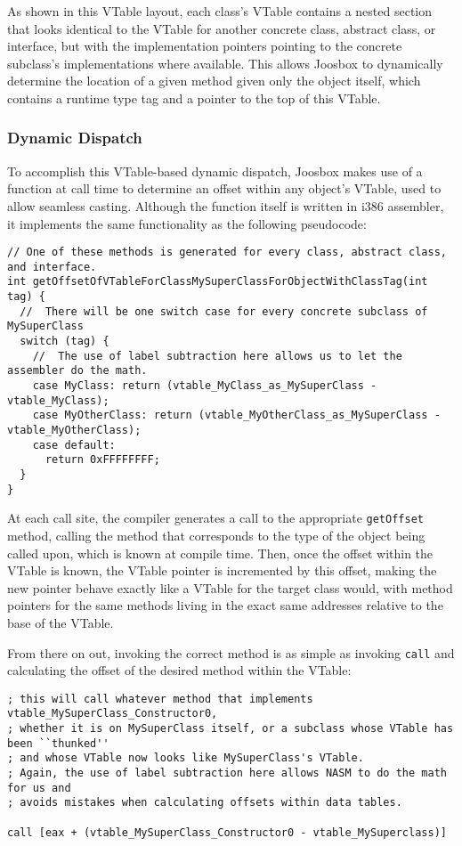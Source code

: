 \documentclass[letterpaper]{article}
\begin{document}
  As shown in this VTable layout, each class's VTable contains a nested section that looks identical
  to the VTable for another concrete class, abstract class, or interface, but with the implementation
  pointers pointing to the concrete subclass's implementations where available. This allows Joosbox to
  dynamically determine the location of a given method given only the object itself, which contains
  a runtime type tag and a pointer to the top of this VTable.

  \subsubsection{Dynamic Dispatch}

  To accomplish this VTable-based dynamic dispatch, Joosbox makes use of a function at call
  time to determine an offset within any object's VTable, used to allow seamless casting. Although
  the function itself is written in i386 assembler, it implements the same functionality as the following
  pseudocode:

  \begin{verbatim}
// One of these methods is generated for every class, abstract class, and interface.
int getOffsetOfVTableForClassMySuperClassForObjectWithClassTag(int tag) {
  //  There will be one switch case for every concrete subclass of MySuperClass
  switch (tag) {
    //  The use of label subtraction here allows us to let the assembler do the math.
    case MyClass: return (vtable_MyClass_as_MySuperClass - vtable_MyClass);
    case MyOtherClass: return (vtable_MyOtherClass_as_MySuperClass - vtable_MyOtherClass);
    case default:
      return 0xFFFFFFFF;
  }
}
  \end{verbatim}

  At each call site, the compiler generates a call to the appropriate {\tt getOffset} method,
  calling the method that corresponds to the type of the object being called upon, which is known at compile
  time. Then, once the offset within the VTable is known, the VTable pointer is incremented by this offset,
  making the new pointer behave exactly like a VTable for the target class would, with method pointers for
  the same methods living in the exact same addresses relative to the base of the VTable.

  From there on out, invoking the correct method is as simple as invoking {\tt call} and
  calculating the offset of the desired method within the VTable:

  \begin{verbatim}
; this will call whatever method that implements vtable_MySuperClass_Constructor0,
; whether it is on MySuperClass itself, or a subclass whose VTable has been ``thunked''
; and whose VTable now looks like MySuperClass's VTable.
; Again, the use of label subtraction here allows NASM to do the math for us and
; avoids mistakes when calculating offsets within data tables.

call [eax + (vtable_MySuperClass_Constructor0 - vtable_MySuperclass)]
  \end{verbatim}
\end{document}
